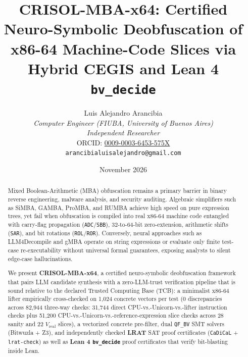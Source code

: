 \documentclass[11pt,a4paper]{article}
\title{\textbf{CRISOL-MBA-x64: Certified Neuro-Symbolic Deobfuscation of x86-64 Machine-Code Slices via Hybrid CEGIS and Lean 4 \texttt{bv\_decide}}}
\author{
  Luis Alejandro Arancibia\\
  \textit{Computer Engineer (FIUBA, University of Buenos Aires)}\\
  \textit{Independent Researcher}\\
  ORCID: \href{https://orcid.org/0009-0003-6453-575X}{0009-0003-6453-575X}\\
  \texttt{arancibialuisalejandro@gmail.com}
}
\date{November 2026}
\begin{document}
\maketitle

\begin{abstract}
Mixed Boolean-Arithmetic (MBA) obfuscation remains a primary barrier in binary reverse engineering, malware analysis, and security auditing. Algebraic simplifiers such as SiMBA, GAMBA, ProMBA, and RUMBA achieve high speed on pure expression trees, yet fail when obfuscation is compiled into real x86-64 machine code entangled with carry-flag propagation (\texttt{ADC}/\texttt{SBB}), 32-to-64-bit zero-extension, arithmetic shifts (\texttt{SAR}), and bit rotations (\texttt{ROL}/\texttt{ROR}). Conversely, neural approaches such as LLM4Decompile and gMBA operate on string expressions or evaluate only finite test-case re-executability without universal formal guarantees, exposing analysts to silent edge-case hallucinations.

We present \textbf{CRISOL-MBA-x64}, a certified neuro-symbolic deobfuscation framework that pairs LLM candidate synthesis with a zero-LLM-trust verification pipeline that is sound relative to the declared Trusted Computing Base (TCB): a minimalist x86-64 lifter empirically cross-checked on 1,024 concrete vectors per test (0 discrepancies across 82,944 three-way checks: 31,744 direct CPU-vs.-Unicorn-vs.-lifter instruction checks plus 51,200 CPU-vs.-Unicorn-vs.-reference-expression slice checks across 28 sanity and 22 $V_{\mathrm{real}}$ slices), a vectorized concrete pre-filter, dual \texttt{QF\_BV} SMT solvers (Bitwuzla + Z3), and independently checked \textbf{LRAT} SAT proof certificates (\texttt{CaDiCaL} + \texttt{lrat-check}) as well as \textbf{Lean 4 \texttt{bv\_decide}} proof certificates that verify bit-blasting inside Lean.


\end{abstract}
\end{document}
